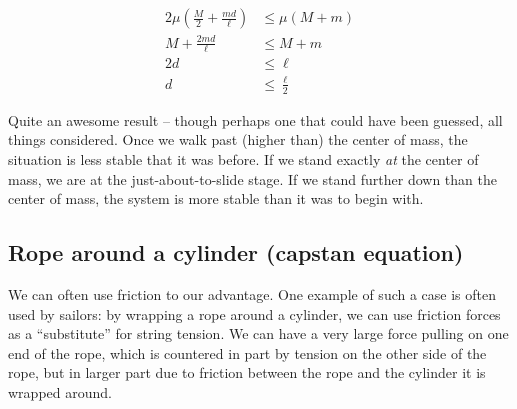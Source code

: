 \begin{align}
2 \mu \left(\frac{M}{2} + \frac{m d}{\ell}\right) &\le \mu (M + m)\\
M + \frac{2 m d}{\ell} &\le M + m\\
2 d &\le \ell\\
d &\le \frac{\ell}{2}
\end{align}

Quite an awesome result -- though perhaps one that could have been guessed, all things considered. Once we walk past (higher than) the center of mass, the situation is less stable that it was before. If we stand exactly \emph{at} the center of mass, we are at the just-about-to-slide stage. If we stand further down than the center of mass, the system is more stable than it was to begin with.

\subsection{Rope around a cylinder (capstan equation)}

We can often use friction to our advantage. One example of such a case is often used by sailors: by wrapping a rope around a cylinder, we can use friction forces as a ``substitute'' for string tension. We can have a very large force pulling on one end of the rope, which is countered in part by tension on the other side of the rope, but in larger part due to friction between the rope and the cylinder it is wrapped around.

